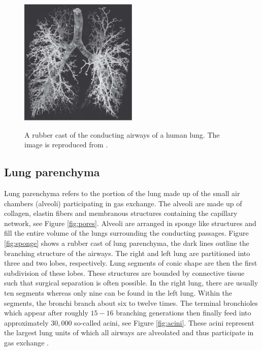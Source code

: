%
\begin{figure}[H]
  \centering
{\label{fig:mouse}\includegraphics[width=0.5\textwidth]{figures/images/lung_west.pdf}}                
  \label{fig:acinar_units}
\caption{A rubber cast of the conducting airways of a human lung. The image is reproduced from \cite{west2008respiratory}.}
\label{fig:rubber_tree}
\end{figure}

\subsection{Lung parenchyma} 
 Lung parenchyma refers to the portion of the lung made up of the small air chambers (alveoli) participating in gas exchange. The alveoli are made up of collagen, elastin fibers and membranous structures containing the capillary network, see Figure \ref{fig:pores}. Alveoli are arranged in sponge like structures and fill the entire volume of the lungs surrounding the conducting passages. Figure \ref{fig:sponge} shows a rubber cast of lung parenchyma, the dark lines outline the branching structure of the airways.
The right and left lung are partitioned into three and two lobes, respectively. Lung segments of conic shape are then the first subdivision of these lobes. These structures are bounded by connective tissue such that surgical separation is often possible. In the right lung, there are usually ten segments whereas only nine can be found in the left lung. Within the segments, the bronchi branch about six to twelve times. The terminal bronchioles which appear after roughly $15-16$ branching generations then finally feed into approximately $30,000$ so-called acini, see Figure \ref{fig:acini}. These acini represent the largest lung units of which all airways are alveolated and thus participate in gas exchange \citep{WeichertThesis}.



